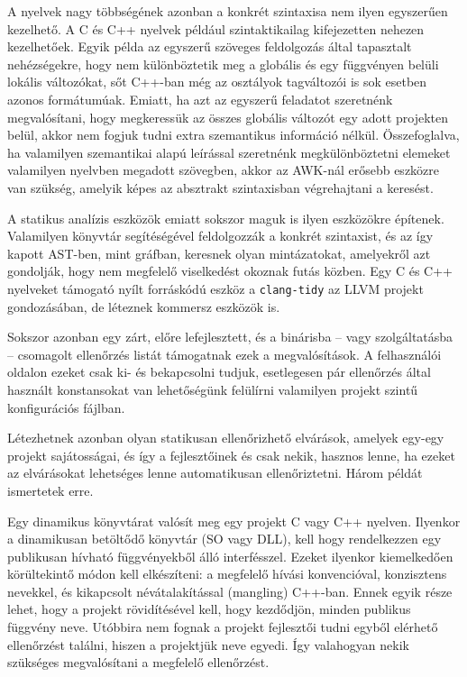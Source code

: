 A nyelvek nagy többségének azonban a konkrét szintaxisa nem ilyen egyszerűen kezelhető. 
A C és C++ nyelvek például szintaktikailag kifejezetten nehezen kezelhetőek.
Egyik példa az egyszerű szöveges feldolgozás által tapasztalt nehézségekre, hogy nem különböztetik meg a globális és egy függvényen belüli lokális változókat, sőt C++-ban még az osztályok tagváltozói is sok esetben azonos formátumúak.
Emiatt, ha azt az egyszerű feladatot szeretnénk megvalósítani, hogy megkeressük az összes globális változót egy adott projekten belül, akkor nem fogjuk tudni extra szemantikus információ nélkül.
Összefoglalva, ha valamilyen szemantikai alapú leírással szeretnénk megkülönböztetni elemeket valamilyen nyelvben megadott szövegben, akkor az AWK-nál erősebb eszközre van szükség, amelyik képes az absztrakt szintaxisban végrehajtani a keresést.

A statikus analízis eszközök emiatt sokszor maguk is ilyen eszközökre építenek.
Valamilyen könyvtár segítéségével feldolgozzák a konkrét szintaxist, és az így kapott \gls{AST}-ben, mint gráfban, keresnek olyan mintázatokat, amelyekről azt gondolják, hogy nem megfelelő viselkedést okoznak futás közben.
Egy C és C++ nyelveket támogató nyílt forráskódú eszköz a {\tt clang-tidy} az LLVM projekt gondozásában, de léteznek kommersz eszközök is.

Sokszor azonban egy zárt, előre lefejlesztett, és a binárisba -- vagy szolgáltatásba -- csomagolt ellenőrzés listát támogatnak ezek a megvalósítások.
A felhasználói oldalon ezeket csak ki- és bekapcsolni tudjuk, esetlegesen pár ellenőrzés által használt konstansokat van lehetőségünk felülírni valamilyen projekt szintű konfigurációs fájlban.

Létezhetnek azonban olyan statikusan ellenőrizhető elvárások, amelyek egy-egy projekt sajátosságai, és így a fejlesztőinek és csak nekik, hasznos lenne, ha ezeket az elvárásokat lehetséges lenne automatikusan ellenőriztetni.
Három példát ismertetek erre.

Egy dinamikus könyvtárat valósít meg egy projekt C vagy C++ nyelven.
Ilyenkor a dinamikusan betöltődő könyvtár (\gls{SO} vagy \gls{DLL}), kell hogy rendelkezzen egy publikusan hívható függvényekből álló interfésszel.
Ezeket ilyenkor kiemelkedően körültekintő módon kell elkészíteni: a megfelelő hívási konvencióval, konzisztens nevekkel, és kikapcsolt névátalakítással (mangling) C++-ban.
Ennek egyik része lehet, hogy a projekt rövidítésével kell, hogy kezdődjön, minden publikus függvény neve.
Utóbbira nem fognak a projekt fejlesztői tudni egyből elérhető ellenőrzést találni, hiszen a projektjük neve egyedi.
Így valahogyan nekik szükséges megvalósítani a megfelelő ellenőrzést.

